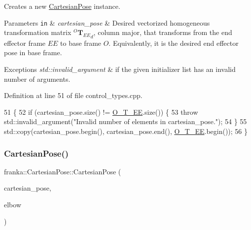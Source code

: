 Creates a new \hyperlink{classfranka_1_1CartesianPose}{Cartesian\+Pose} instance.


\begin{DoxyParams}[1]{Parameters}
\mbox{\tt in}  & {\em cartesian\+\_\+pose} & Desired vectorized homogeneous transformation matrix $^O {\mathbf{T}_{EE}}_{d}$, column major, that transforms from the end effector frame $EE$ to base frame $O$. Equivalently, it is the desired end effector pose in base frame.\\
\hline
\end{DoxyParams}

\begin{DoxyExceptions}{Exceptions}
{\em std\+::invalid\+\_\+argument} & if the given initializer list has an invalid number of arguments. \\
\hline
\end{DoxyExceptions}


Definition at line 51 of file control\+\_\+types.\+cpp.


\begin{DoxyCode}
51                                                                        \{
52   \textcolor{keywordflow}{if} (cartesian\_pose.size() != \hyperlink{classfranka_1_1CartesianPose_a406e53e3d8fe594a11888f516eb4bf7d}{O\_T\_EE}.size()) \{
53     \textcolor{keywordflow}{throw} std::invalid\_argument(\textcolor{stringliteral}{"Invalid number of elements in cartesian\_pose."});
54   \}
55   std::copy(cartesian\_pose.begin(), cartesian\_pose.end(), \hyperlink{classfranka_1_1CartesianPose_a406e53e3d8fe594a11888f516eb4bf7d}{O\_T\_EE}.begin());
56 \}
\end{DoxyCode}
\mbox{\label{classfranka_1_1CartesianPose_ab7fb1dfd7cdb89c0caebab95c669ba49}} 
\subsubsection{\texorpdfstring{Cartesian\+Pose()}{CartesianPose()}\hspace{0.1cm}{\footnotesize\ttfamily [4/4]}}
{\footnotesize\ttfamily franka\+::\+Cartesian\+Pose\+::\+Cartesian\+Pose (\begin{DoxyParamCaption}\item[{std\+::initializer\+\_\+list$<$ double $>$}]{cartesian\+\_\+pose,  }\item[{std\+::initializer\+\_\+list$<$ double $>$}]{elbow }\end{DoxyParamCaption})}

